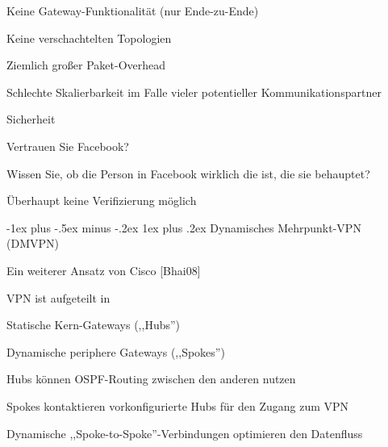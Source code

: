 \documentclass[a4paper]{article}
\makeatletter
\renewcommand{\subsubsection}{\@startsection{subsubsection}{3}{0mm}%
 {-1ex plus -.5ex minus -.2ex}%
 {1ex plus .2ex}%
 {\normalfont\small\bfseries}}
\makeatother
\begin{document}
\begin{multicols}{3}
\begin{itemize*}
\begin{itemize*}
                  \begin{itemize*}
                        \item Keine Gateway-Funktionalität (nur Ende-zu-Ende)
                        \item Keine verschachtelten Topologien
                        \item Ziemlich großer Paket-Overhead
                        \item Schlechte Skalierbarkeit im Falle vieler potentieller Kommunikationspartner
                        \item Sicherheit
                        \begin{itemize*} \item Vertrauen Sie Facebook? \item Wissen Sie, ob die Person in Facebook wirklich die ist, die sie behauptet? \item Überhaupt keine Verifizierung möglich \end{itemize*}
                  \end{itemize*}
            \end{itemize*}


            \subsubsection{Dynamisches Mehrpunkt-VPN
                  (DMVPN)}

            \begin{itemize*}
                  \item
                  Ein weiterer Ansatz von Cisco {[}Bhai08{]}
                  \item
                  VPN ist aufgeteilt in

                  \begin{itemize*}
                        \item Statische Kern-Gateways (,,Hubs'')
                        \item Dynamische periphere Gateways (,,Spokes'')
                  \end{itemize*}
                  \item
                  Hubs können OSPF-Routing zwischen den anderen nutzen
                  \item
                  Spokes kontaktieren vorkonfigurierte Hubs für den Zugang zum VPN
                  \item
                  Dynamische ,,Spoke-to-Spoke''-Verbindungen optimieren den Datenfluss
            \end{itemize*}



\end{itemize*}
\end{multicols}
\end{document}

